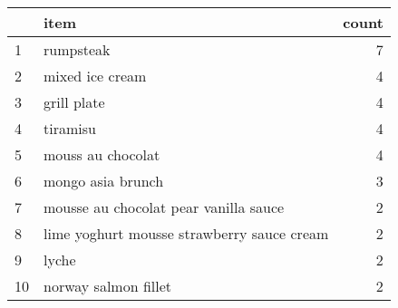 \begin{tabular}{llr}
\toprule
{} &                                               item &  count \\
\midrule
1   &                                          rumpsteak &      7 \\
2   &                                    mixed ice cream &      4 \\
3   &                                        grill plate &      4 \\
4   &                                           tiramisu &      4 \\
5   &                                  mouss au chocolat &      4 \\
6   &                                  mongo asia brunch &      3 \\
7   &              mousse au chocolat pear vanilla sauce &      2 \\
8   &         lime yoghurt mousse strawberry sauce cream &      2 \\
9   &                                              lyche &      2 \\
10  &                               norway salmon fillet &      2 \\
\bottomrule
\end{tabular}
